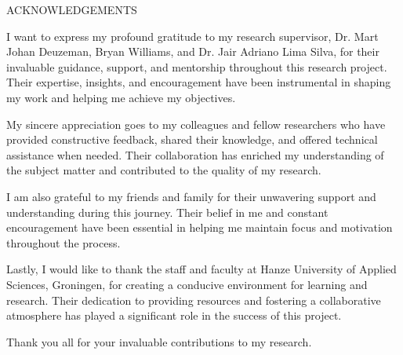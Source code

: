 \begin{center}
    ACKNOWLEDGEMENTS
    \vspace{5mm} %
\end{center}

I want to express my profound gratitude to my research supervisor, Dr. Mart Johan Deuzeman, Bryan Williams, and Dr. Jair Adriano Lima Silva, for their invaluable guidance, support, and mentorship throughout this research project. Their expertise, insights, and encouragement have been instrumental in shaping my work and helping me achieve my objectives.

My sincere appreciation goes to my colleagues and fellow researchers who have provided constructive feedback, shared their knowledge, and offered technical assistance when needed. Their collaboration has enriched my understanding of the subject matter and contributed to the quality of my research.

I am also grateful to my friends and family for their unwavering support and understanding during this journey. Their belief in me and constant encouragement have been essential in helping me maintain focus and motivation throughout the process.

Lastly, I would like to thank the staff and faculty at Hanze University of Applied Sciences, Groningen, for creating a conducive environment for learning and research. Their dedication to providing resources and fostering a collaborative atmosphere has played a significant role in the success of this project.

\vspace{1em}

Thank you all for your invaluable contributions to my research.
